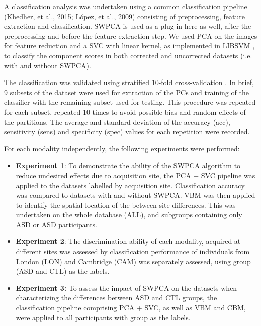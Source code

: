A classification analysis was undertaken using a common classification pipeline (Khedher, et al., 2015; López, et al., 2009) consisting of preprocessing, feature extraction and classification. \ac{SWPCA} is used as a plug-in here as well, after the preprocessing and before the feature extraction step. We used \ac{PCA} on the images for feature reduction and a \acf{SVC} with linear kernel, as implemented in LIBSVM \cite{Chang2001}, to classify the component scores in both corrected and uncorrected datasets (i.e. with and without \ac{SWPCA}).

The classification was validated using stratified 10-fold cross-va\-li\-da\-tion \cite{Kohavi1995a}. In brief, 9 subsets of the dataset were used for extraction of the PCs and training of the classifier with the remaining subset used for testing. This procedure was repeated for each subset, repeated 10 times to avoid possible bias and random effects of the partitions. The average and standard deviation of the accuracy (acc), sensitivity (sens) and specificity (spec) values for each repetition were recorded. 

For each modality independently, the following experiments were performed: 
\begin{itemize}
	\item \textbf{Experiment 1}: To demonstrate the ability of the \ac{SWPCA} algorithm	to reduce undesired effects due to acquisition site, the \ac{PCA} + \ac{SVC} pipeline was applied to the datasets labelled by acquisition site. Classification accuracy was compared to datasets with and without \ac{SWPCA}. \ac{VBM} was then applied to identify the spatial location of the between-site differences. This was undertaken on the whole database (ALL), and subgroups containing only \ac{ASD} or \ac{ASD} participants. 
	
	\item \textbf{Experiment 2}: The discrimination ability of each modality, acquired at different sites was assessed by classification performance of individuals from London (LON) and Cambridge (CAM) was separately assessed, using group (\ac{ASD} and \ac{CTL}) as the labels. 
	
	\item \textbf{Experiment 3:} To assess the impact of \ac{SWPCA} on the datasets when characterizing the differences between \ac{ASD} and \ac{CTL} groups, the classification pipeline comprising \ac{PCA} + \ac{SVC}, as well as \ac{VBM} and \ac{CBM}, were applied to all participants with group as the labels.
	
\end{itemize}
 

